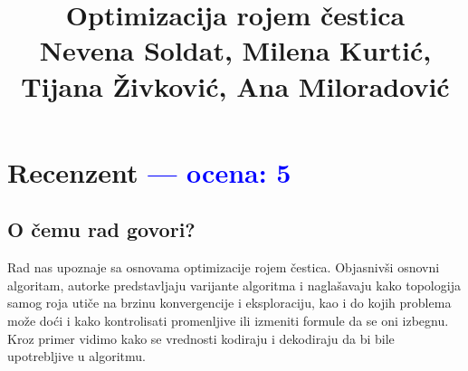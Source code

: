 \documentclass[a4paper]{report}
\newcommand{\odgovor}[1]{\textcolor{blue}{#1}}
\begin{document}
\title{Optimizacija rojem čestica\\ \small{Nevena Soldat, Milena Kurtić, Tijana Živković, Ana Miloradović}}

\maketitle

\tableofcontents


\chapter{Recenzent \odgovor{--- ocena: 5} }


\section{O čemu rad govori?}
Rad nas upoznaje sa osnovama optimizacije rojem čestica. Objasnivši osnovni algoritam, autorke predstavljaju varijante algoritma i naglašavaju kako topologija samog roja utiče na brzinu konvergencije i eksploraciju, kao i do kojih problema može doći i kako kontrolisati promenljive ili izmeniti formule da se oni izbegnu. Kroz primer vidimo kako se vrednosti kodiraju i dekodiraju da bi bile upotrebljive u algoritmu.
\end{document}
